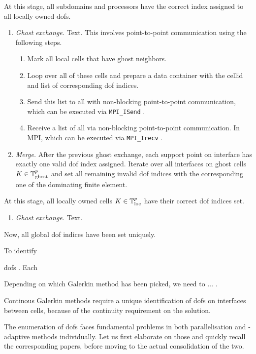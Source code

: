 At this stage, all subdomains and processors have the correct index assigned to all locally owned \glspl{dof}.
\begin{enumerate}[resume]
  \item \textit{Ghost exchange.}
  Text.
  This involves point-to-point communication using the following steps.
  \begin{enumerate}[label=\alph*.]
    \item Mark all local cells that have ghost neighbors.
    \item Loop over all of these cells and prepare a data container with the cellid and list of corresponding dof indices.
    \item Send this list to all
    with non-blocking point-to-point communication, which can be executed via \texttt{MPI\_ISend} \parencite{mpi31}.
    \item Receive a list of all via non-blocking point-to-point communication. In MPI, which can be executed via \texttt{MPI\_Irecv} \parencite{mpi31}.
  \end{enumerate}
  \item \textit{Merge.}
  After the previous ghost exchange, each support point on interface has exactly one valid \gls{dof} index assigned. Iterate over all interfaces on ghost cells $K \in \mathbb{T}^p_{\text{ghost}}$ and set all remaining invalid \gls{dof} indices with the corresponding one of the dominating finite element.
\end{enumerate}
At this stage, all locally owned cells $K \in \mathbb{T}^p_{\text{loc}}$ have their correct \gls{dof} indices set.
\begin{enumerate}[resume]
  \item \textit{Ghost exchange.}
  Text.
\end{enumerate}
Now, all global \gls{dof} indices have been set uniquely.


To identify 

\glspl{dof} . Each

Depending on which Galerkin method has been picked, we need to ... .

Continous Galerkin methods require a unique identification of \glspl{dof} on interfaces between cells, because of the continuity requirement on the solution.




The enumeration of dofs faces fundamental problems in both parallelisation and \hp-adaptive methods individually. Let us first elaborate on those and quickly recall the corresponding papers, before moving to the actual consolidation of the two.

